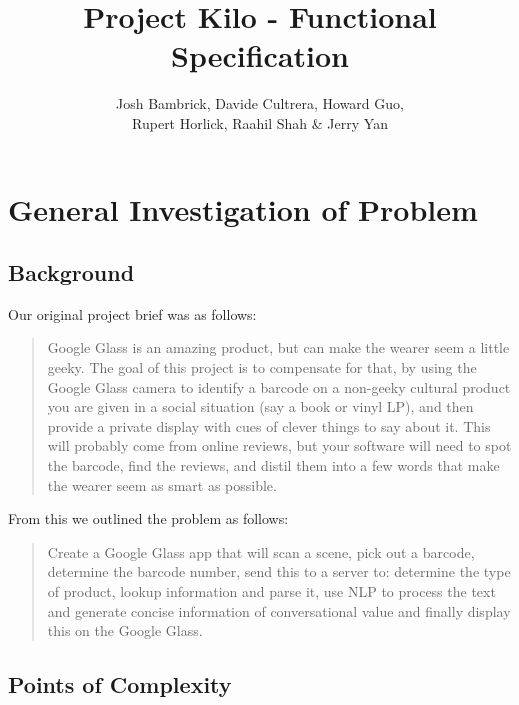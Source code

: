 \documentclass[12pt,a4paper]{report}
\title{Project Kilo - Functional Specification}
\author{Josh Bambrick, Davide Cultrera, Howard Guo,\\ Rupert Horlick, Raahil Shah \& Jerry Yan}
\begin{document}
\lstset{language=Java}

\maketitle

\tableofcontents

\chapter{General Investigation of Problem}

\section{Background}

Our original project brief was as follows:

\begin{quote}

Google Glass is an amazing product, but can make the wearer seem a little geeky. The goal of this project is to compensate for that, by using the Google Glass camera to identify a barcode on a non-geeky cultural product you are given in a social situation (say a book or vinyl LP), and then provide a private display with cues of clever things to say about it. This will probably come from online reviews, but your software will need to spot the barcode, find the reviews, and distil them into a few words that make the wearer seem as smart as possible. 

\end{quote}

From this we outlined the problem as follows:

\begin{quote}

Create a Google Glass app that will scan a scene, pick out a barcode, determine the barcode number, send this to a server to: determine the type of product, lookup information and parse it, use NLP to process the text and generate concise information of conversational value and finally display this on the Google Glass.

\end{quote}

\section{Points of Complexity}
\end{document}
